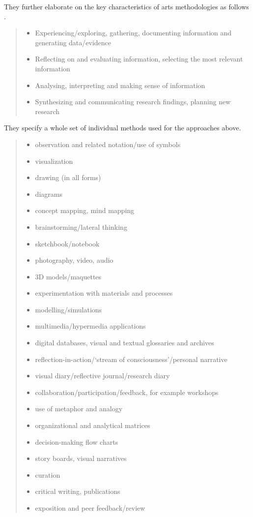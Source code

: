 They further elaborate on the key characteristics of arts methodologies as follows \autocite{Gray2004}.

\begin{quotation}
\begin{itemize}
  \item Experiencing/exploring, gathering, documenting information and generating data/evidence
  \item Reflecting on and evaluating information, selecting the most relevant information
  \item Analysing, interpreting and making sense of information
  \item Synthesizing and communicating research findings, planning new research
\end{itemize}
\end{quotation}

They specify a whole set of individual methods used for the approaches above.

\begin{quotation}
\begin{itemize}
  \item observation and related notation/use of symbols
  \item visualization
  \item drawing (in all forms)
  \item diagrams
  \item concept mapping, mind mapping
  \item brainstorming/lateral thinking
  \item sketchbook/notebook
  \item photography, video, audio
  \item 3D models/maquettes
  \item experimentation with materials and processes
  \item modelling/simulations
  \item multimedia/hypermedia applications
  \item digital databases, visual and textual glossaries and archives
  \item reflection-in-action/`stream of consciousness'/personal narrative
  \item visual diary/reflective journal/research diary
  \item collaboration/participation/feedback, for example workshops
  \item use of metaphor and analogy
  \item organizational and analytical matrices
  \item decision-making flow charts
  \item story boards, visual narratives
  \item curation
  \item critical writing, publications
  \item exposition and peer feedback/review
\end{itemize}
\end{quotation}

